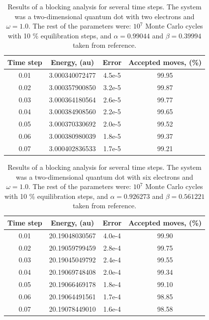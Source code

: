 	
\begin{table}
\centering
\begin{tabular}{cccc}
\toprule[1pt]
\textbf{Time step} & \textbf{Energy}, (au) 	& \textbf{Error} & \textbf{Accepted moves}, (\%) \\
\midrule[1pt]
0.01 & 3.000340072477 & 4.5e-5 & 99.95\\
0.02 & 3.000357900850 & 3.2e-5 & 99.87\\
0.03 & 3.000364180564 & 2.6e-5 & 99.77\\
0.04 & 3.000384908560 & 2.2e-5 & 99.65\\
0.05 & 3.000370330692 & 2.0e-5 & 99.52\\
0.06 & 3.000380980039 & 1.8e-5 & 99.37\\
0.07 & 3.000402836533 & 1.7e-5 & 99.21\\
\bottomrule[1pt]
\end{tabular}\caption{Results of a blocking analysis for several time steps. The system was a two-dimensional quantum dot with two electrons and $\omega=1.0$. The rest of the parameters were: $10^7$ Monte Carlo cycles with 10 \% equilibration steps, and $\alpha = 0.99044$ and $\beta = 0.39994$ taken from reference\cite{Albrigtsen}.}\label{blockingDtTable2DQDot2e}
\end{table}





\begin{table}
\centering
\begin{tabular}{cccc}
\toprule[1pt]
\textbf{Time step} & \textbf{Energy}, (au) 	& \textbf{Error} & \textbf{Accepted moves}, (\%) \\
\midrule[1pt]
0.01 & 20.19048030567 & 4.0e-4 & 99.90\\
0.02 & 20.19059799459 & 2.8e-4 & 99.75\\
0.03 & 20.19045049792 & 2.4e-4 & 99.55\\
0.04 & 20.19069748408 & 2.0e-4 & 99.34\\
0.05 & 20.19066469178 & 1.8e-4 & 99.10\\
0.06 & 20.19064491561 & 1.7e-4 & 98.85\\
0.07 & 20.19078449010 & 1.6e-4 & 98.58\\
\bottomrule[1pt]
\end{tabular}\caption{Results of a blocking analysis for several time steps. The system was a two-dimensional quantum dot with six electrons and $\omega=1.0$. The rest of the parameters were: $10^7$ Monte Carlo cycles with 10 \% equilibration steps, and $\alpha = 0.926273$ and $\beta = 0.561221$ taken from reference\cite{Albrigtsen}.}\label{blockingDtTable2DQDot6e}
\end{table}

